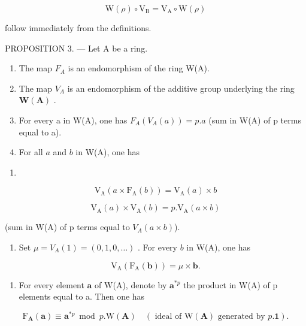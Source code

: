 \[
\mathrm{W} (\rho) \circ \mathrm{V} _ {\mathrm{B}} = \mathrm{V} _ {\mathrm{A}} \circ \mathrm{W} (\rho)
\]

follow immediately from the definitions.

PROPOSITION 3. — Let A be a ring.

\begin{enumerate}
\def\labelenumi{\alph{enumi})}
\item
  The map \(F_{A}\) is an endomorphism of the ring W(A).
\item
  The map \(V_{A}\) is an endomorphism of the additive group underlying the ring \(\mathbf{W}(\mathbf{A})\) .
\item
  For every a in W(A), one has \(F_{A}(V_{A}(a)) = p.a\) (sum in W(A) of p terms equal to a).
\item
  For all \(a\) and \(b\) in W(A), one has
\end{enumerate}

\begin{enumerate}
\def\labelenumi{(\arabic{enumi})}
\setcounter{enumi}{29}
\tightlist
\item
\end{enumerate}

\[
\mathrm{V} _ {\mathrm{A}} (a \times \mathrm{F} _ {\mathrm{A}} (b)) = \mathrm{V} _ {\mathrm{A}} (a) \times b\tag{31}
\]

\[
\mathrm{V} _ {\mathrm{A}} (a) \times \mathrm{V} _ {\mathrm{A}} (b) = p. \mathrm{V} _ {\mathrm{A}} (a \times b)
\]

(sum in W(A) of p terms equal to \(V_A(a \times b)\)).

\begin{enumerate}
\def\labelenumi{\alph{enumi})}
\setcounter{enumi}{4}
\tightlist
\item
  Set \(\mu = V_{A}(1) = (0, 1, 0, \ldots)\) . For every \(b\) in W(A), one has
\end{enumerate}

\[
\mathrm{V} _ {\mathrm{A}} \left(\mathrm{F} _ {\mathrm{A}} (\boldsymbol {b})\right) = \mu \times \boldsymbol {b}.\tag{32}
\]

\begin{enumerate}
\def\labelenumi{\alph{enumi})}
\setcounter{enumi}{5}
\tightlist
\item
  For every element \(\mathbf{a}\) of W(A), denote by \(\mathbf{a}^{*p}\) the product in W(A) of p elements equal to a. Then one has
\end{enumerate}

\[
\mathrm{F} _ {\mathbf {A}} (\boldsymbol {a}) \equiv \boldsymbol {a} ^ {* p} \bmod p. \mathrm{W} (\mathbf {A}) \quad (\text { ideal of } \mathrm{W} (\mathbf {A}) \text { generated by } p. \mathbf {1}).\tag{33}
\]

